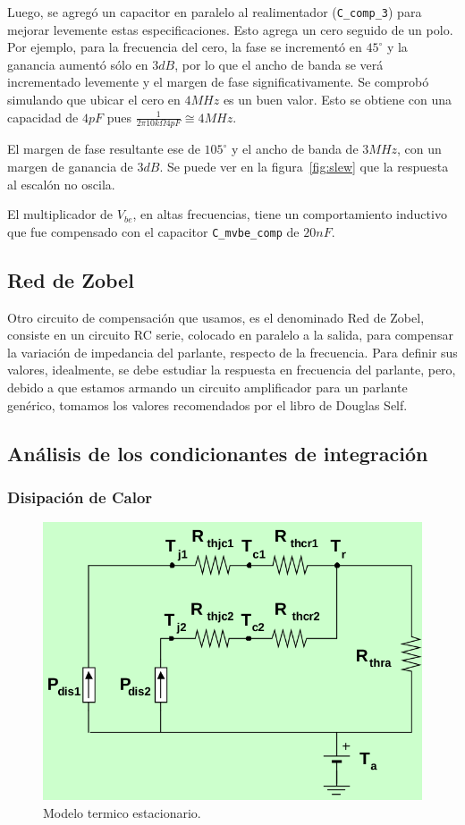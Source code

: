 \documentclass[a4paper,12pt,twoside]{article}
\begin{document}
Luego, se agregó un capacitor en paralelo al realimentador (\texttt{C\_comp\_3}) para mejorar levemente estas especificaciones. Esto agrega un cero seguido de un polo. Por ejemplo, para la frecuencia del cero, la fase se incrementó en $45^{\circ}$ y la ganancia aumentó sólo en $3dB$, por lo que el ancho de banda se verá incrementado levemente y el margen de fase significativamente. Se comprobó simulando que ubicar el cero en $4MHz$ es un buen valor. Esto se obtiene con una capacidad de $4pF$ pues $\frac{1}{2 \pi 10k\Omega 4pF}\cong 4MHz$.

El margen de fase resultante ese de $105^{\circ}$ y el ancho de banda de $3MHz$, con un margen de ganancia de $3dB$. Se puede ver en la figura~\ref{fig:slew} que la respuesta al escalón no oscila.

El multiplicador de $V_{be}$, en altas frecuencias, tiene un comportamiento inductivo que fue compensado con el capacitor \texttt{C\_mvbe\_comp} de $20nF$.

\subsection{Red de Zobel}

Otro circuito de compensación que usamos, es el denominado Red de Zobel, consiste en un circuito RC serie, colocado en paralelo a la salida, para compensar la variación de impedancia del parlante, respecto de la frecuencia. Para definir sus valores, idealmente, se debe estudiar la respuesta en frecuencia del parlante, pero, debido a que estamos armando un circuito amplificador para un parlante genérico, tomamos los valores recomendados por el libro de Douglas Self. 

\subsection{Análisis de los condicionantes de integración}

\subsubsection{Disipación de Calor}
\label{sec:disipadores}
\begin{figure}[H]
    \centering
    \includegraphics[height=0.4\textwidth]{img/calculo_disipador}
    \caption{Modelo termico estacionario.}
    \label{fig:disipadores}
\end{figure}
\end{document}
